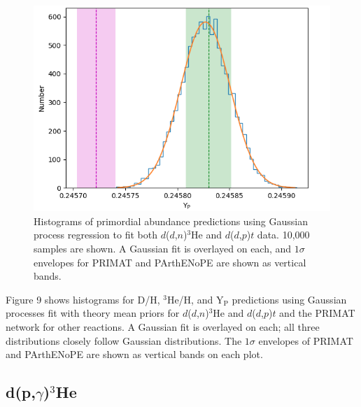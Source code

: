 \documentclass[%
 reprint,
superscriptaddress,
nofootinbib,
 amsmath,amssymb,
 aps,
 pra,
]{revtex4-2}
\begin{document}
\begin{figure}
\begin{minipage}{0.32\textwidth}
	\end{minipage}
	\hspace{0mm}
	\begin{minipage}{0.32\textwidth}
		\centering
		\includegraphics[width=\linewidth]{Figures/dd_theory_yp.png}
	\end{minipage}
	\caption{Histograms of primordial abundance predictions using Gaussian process regression to fit both $d$($d$,$n$)$^3$He and $d$($d$,$p$)$t$ data. 10,000 samples are shown. A Gaussian fit is overlayed on each, and $1\sigma$ envelopes for PRIMAT and PArthENoPE are shown as vertical bands.}
\end{figure}

Figure 9 shows histograms for D/H, $^3$He/H, and Y$_\text{P}$ predictions using Gaussian processes fit with theory mean priors for $d$($d$,$n$)$^3$He and $d$($d$,$p$)$t$ and the PRIMAT network for other reactions. A Gaussian fit is overlayed on each; all three distributions closely follow Gaussian distributions. The $1\sigma$ envelopes of PRIMAT and PArthENoPE are shown as vertical bands on each plot. 

\subsection{d(p,$\gamma$)$^3$He}
\end{document}
